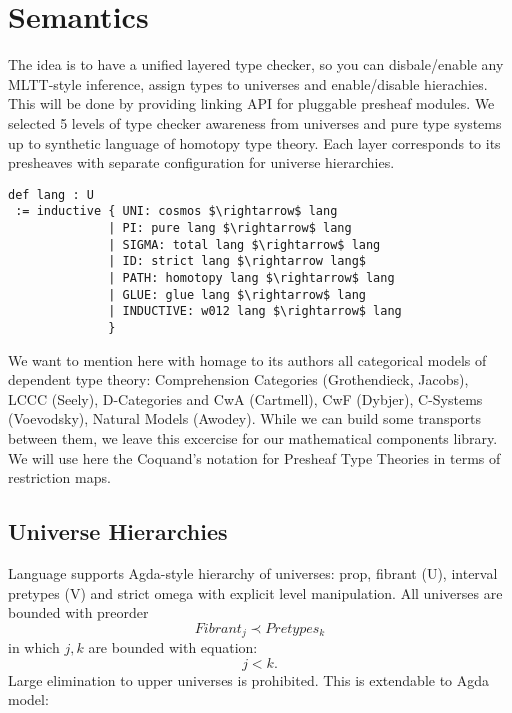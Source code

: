 \documentclass{article}
\begin{document}
\newpage
\section{Semantics}
The idea is to have a unified layered type checker, so you can disbale/enable any MLTT-style inference,
assign types to universes and enable/disable hierachies. This will be done by providing linking API for
pluggable presheaf modules. We selected 5 levels of type checker awareness from universes and pure type
systems up to synthetic language of homotopy type theory. Each layer corresponds to its presheaves with
separate configuration for universe hierarchies.

\begin{lstlisting}[mathescape=true]
def lang : U
 := inductive { UNI: cosmos $\rightarrow$ lang
              | PI: pure lang $\rightarrow$ lang
              | SIGMA: total lang $\rightarrow$ lang
              | ID: strict lang $\rightarrow lang$
              | PATH: homotopy lang $\rightarrow$ lang
              | GLUE: glue lang $\rightarrow$ lang
              | INDUCTIVE: w012 lang $\rightarrow$ lang
              }
\end{lstlisting}

We want to mention here with homage to its authors all categorical models of dependent type theory:
Comprehension Categories (Grothendieck, Jacobs), LCCC (Seely), D-Categories and CwA (Cartmell),
CwF (Dybjer), C-Systems (Voevodsky), Natural Models (Awodey). While we can build some transports
between them, we leave this excercise for our mathematical components library.
We will use here the Coquand's notation for Presheaf Type Theories in terms of restriction maps.

\subsection{Universe Hierarchies}

Language supports Agda-style hierarchy of universes: prop, fibrant (U), interval pretypes (V) and
strict omega with explicit level manipulation. All universes are bounded with preorder
\begin{equation}
Fibrant_j \prec Pretypes_k
\end{equation}
in which $j,k$ are bounded with equation:
\begin{equation}
j < k.
\end{equation}
Large elimination to upper universes is prohibited. This is extendable to Agda model:
\end{document}

